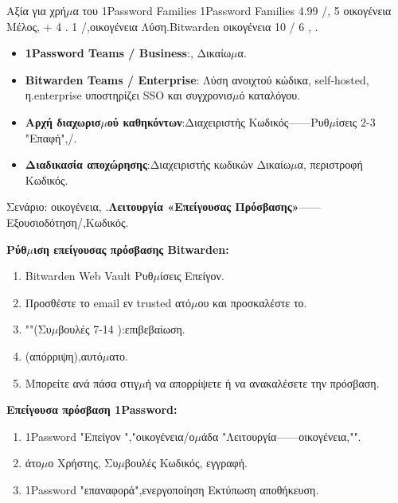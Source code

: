 \begin{tcbinfo}{Αξία για χρή$\mu$α του 1Password Families}
1Password Families 4.99 /, 5 οικογένεια Μέλος, + 4 . 1 /,οικογένεια Λύση.Bitwarden οικογένεια 10 / 6 , .

\end{tcbinfo}


\begin{itemize}
  \item \textbf{1Password Teams / Business}:, Δικαίω$\mu$α.
  \item \textbf{Bitwarden Teams / Enterprise}: Λύση ανοιχτού κώδικα, self-hosted, η.enterprise υποστηρίζει SSO και συγχρονισ$\mu$ό καταλόγου.
  \item \textbf{Αρχή διαχωρισ$\mu$ού καθηκόντων}:Διαχειριστής Κωδικός——Ρυθ$\mu$ίσεις 2-3 "Επαφή",/.
  \item \textbf{Διαδικασία αποχώρησης}:Διαχειριστής κωδικών Δικαίω$\mu$α, περιστροφή Κωδικός.
\end{itemize}


Σενάριο: οικογένεια, .\textbf{Λειτουργία «Επείγουσας Πρόσβασης»}——Εξουσιοδότηση/,Κωδικός.

\textbf{Ρύθ$\mu$ιση επείγουσας πρόσβασης Bitwarden:}

\begin{enumerate}
  \item Bitwarden Web Vault Ρυθ$\mu$ίσεις Επείγον.
  \item Προσθέστε το email εν trusted ατό$\mu$ου και προσκαλέστε το.
  \item ""(Συ$\mu$βουλές 7-14 ):επιβεβαίωση.
  \item (απόρριψη),αυτό$\mu$ατο.
  \item Μπορείτε ανά πάσα στιγ$\mu$ή να απορρίψετε ή να ανακαλέσετε την πρόσβαση.
\end{enumerate}

\textbf{Επείγουσα πρόσβαση 1Password:}

\begin{enumerate}
  \item 1Password "Επείγον ","οικογένεια/ο$\mu$άδα "Λειτουργία——οικογένεια,"".
  \item άτο$\mu$ο Χρήστης, Συ$\mu$βουλές Κωδικός, εγγραφή.
  \item 1Password "επαναφορά",ενεργοποίηση Εκτύπωση αποθήκευση.
\end{enumerate}

